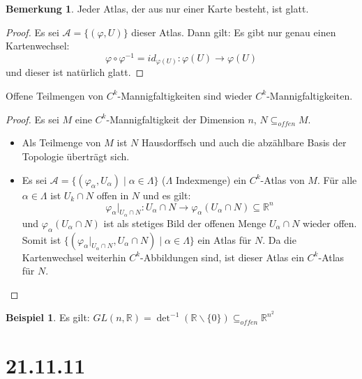 \documentclass[a4paper,11pt,notitlepage]{report}
\theoremstyle{definition}
\newtheorem{remark}{Bemerkung}[chapter]
\newtheorem{example}{Beispiel}[chapter]
\newcommand{\R}{{\ensuremath{\mathbb{R}}}}
\begin{document}
\begin{remark}
	Jeder Atlas, der aus nur einer Karte besteht, ist glatt.
\end{remark}

\begin{proof}
	Es sei $\mathcal{A} = \{(\varphi,U)\}$ dieser Atlas. Dann gilt:
	\newline
	Es gibt nur genau einen Kartenwechsel: 
	$$\varphi \circ \varphi^{-1} = id_{\varphi(U)} \colon \varphi(U) \rightarrow \varphi(U)$$ und dieser ist natürlich glatt.
\end{proof}

\begin{theorem}
	Offene Teilmengen von $C^k$-Mannigfaltigkeiten sind wieder $C^k$-Mannigfaltigkeiten.
\end{theorem}

\begin{proof}
	Es sei $M$ eine $C^k$-Mannigfaltigkeit der Dimension $n$, $N \subseteq_{offen} M$.
	\begin{itemize}
		\item Als Teilmenge von $M$ ist $N$ Hausdorffsch und auch die abzählbare Basis der Topologie überträgt sich.
		\item Es sei $\mathcal{A} = \{(\varphi_\alpha, U_\alpha) \mid \alpha \in \Lambda \}$ ($\Lambda$ Indexmenge) ein $C^k$-Atlas von $M$.
		\newline
		Für alle $\alpha \in \Lambda$ ist $U_k \cap N$ offen in $N$ und es gilt:
		$$\varphi_\alpha \big |_{U_\alpha \cap N} \colon U_\alpha \cap N \rightarrow \varphi_\alpha(U_\alpha \cap N) \subseteq \R^n$$
		und $\varphi_\alpha(U_\alpha \cap N)$ ist als stetiges Bild der offenen Menge $U_\alpha \cap N$ wieder offen.
		\newline
		Somit ist $\{(\varphi_\alpha \big |_{U_\alpha \cap N}, U_\alpha \cap N) \mid \alpha \in \Lambda\}$ ein Atlas für $N$.
		\newline
		Da die Kartenwechsel weiterhin $C^k$-Abbildungen sind, ist dieser Atlas ein $C^k$-Atlas für $N$.
	\end{itemize}
\end{proof}

\begin{example}
	Es gilt: $GL(n,\R) = \det^{-1}(\R \backslash \{0\}) \subseteq_{offen} \R^{n^2}$
\end{example}

\chapter{21.11.11}
\end{document}
